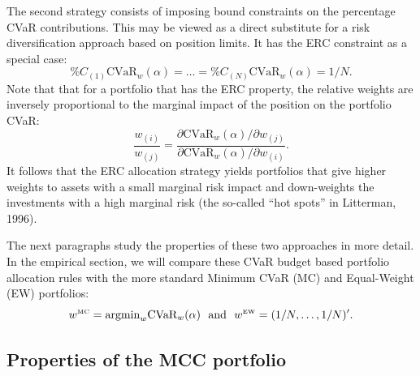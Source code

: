 \documentclass[12pt,a4paper]{article}
\newcommand{\argmin}{{\operatorname{argmin}}}
\begin{document}
The second strategy consists of imposing bound constraints on the percentage CVaR contributions. This may be viewed as a direct substitute for a risk diversification approach based on position limits. It has the ERC constraint as a special case:
\begin{equation}   \%C_{(1)}\mbox{CVaR}_w(\alpha)  = \ldots =  \%C_{(N)}\mbox{CVaR}_w(\alpha) = 1/N. \label{eq:ERCconstraint}\end{equation}
Note that that for a portfolio that has the ERC property, the relative weights are inversely proportional to the marginal impact of the position on the portfolio CVaR:
\begin{equation}   \frac{w_{(i)}}{w_{(j)}} = \frac{ \partial \mbox{CVaR}_w(\alpha)/\partial w_{(j)}}{ \partial \mbox{CVaR}_w(\alpha)/\partial w_{(i)}} . \label{eq:ERCconstraint}\end{equation} It follows that the ERC allocation strategy yields portfolios that give higher weights to assets with a small marginal risk impact and down-weights the investments with a high marginal risk (the so-called ``hot spots'' in Litterman, 1996).

The next paragraphs study the properties of these two approaches in more detail. In the empirical section, we will compare these CVaR budget based portfolio allocation rules with the more standard Minimum CVaR (MC) and Equal-Weight (EW) portfolios:
\begin{equation}   w^{\mbox{\tiny MC}} = \argmin_w \mbox{CVaR}_w(\alpha) \ \ \mbox{and} \ \ w^{\mbox{\tiny EW}} = (1/N,\ldots,1/N)'. \label{eq:benchmarkportfolios}\end{equation}

\subsection{Properties of the MCC portfolio}
\end{document}
